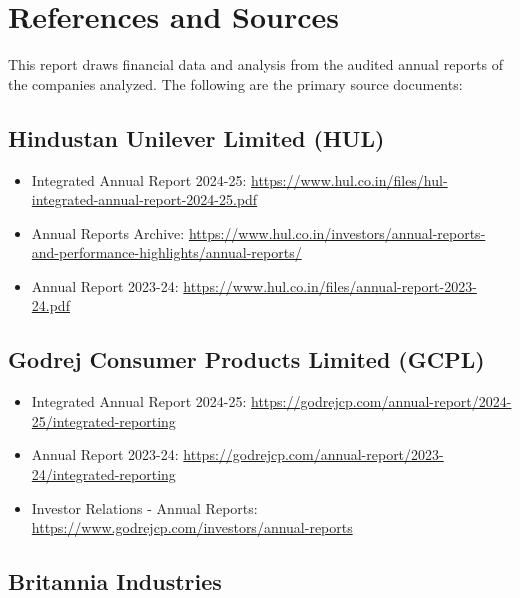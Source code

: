 \documentclass[12pt, a4paper]{report}
\begin{document}
\newpage

\newpage
\chapter{References and Sources}

This report draws financial data and analysis from the audited annual reports of the companies analyzed. The following are the primary source documents:

\section{Hindustan Unilever Limited (HUL)}

\begin{itemize}
    \item Integrated Annual Report 2024-25: \url{https://www.hul.co.in/files/hul-integrated-annual-report-2024-25.pdf}
    
    \item Annual Reports Archive: \url{https://www.hul.co.in/investors/annual-reports-and-performance-highlights/annual-reports/}
    
    \item Annual Report 2023-24: \url{https://www.hul.co.in/files/annual-report-2023-24.pdf}
\end{itemize}

\section{Godrej Consumer Products Limited (GCPL)}

\begin{itemize}
    \item Integrated Annual Report 2024-25: \url{https://godrejcp.com/annual-report/2024-25/integrated-reporting}
    
    \item Annual Report 2023-24: \url{https://godrejcp.com/annual-report/2023-24/integrated-reporting}
    
    \item Investor Relations - Annual Reports: \url{https://www.godrejcp.com/investors/annual-reports}
\end{itemize}

\section{Britannia Industries}
\end{document}

